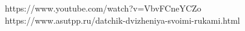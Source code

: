 https://www.youtube.com/watch?v=VbvFCneYCZo
https://www.asutpp.ru/datchik-dvizheniya-svoimi-rukami.html

